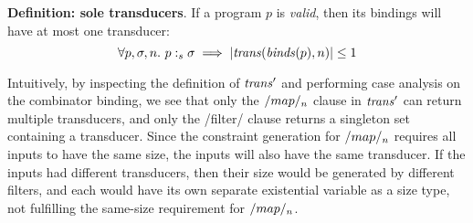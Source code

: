 \textbf{Definition: sole transducers}.
If a program $p$ is \emph{valid}, then its bindings will have at most one transducer:
\[
\forall p, \sigma, n.\ p :_s \sigma \implies |\mathit{trans}(\mathit{binds}(p), n)| \le 1
\]

Intuitively, by inspecting the definition of $\mathit{trans}'$ and performing case analysis on the combinator binding, we see that only the $\Hs/map/_n$ clause in $\mathit{trans}'$ can return multiple transducers, and only the \Hs/filter/ clause returns a singleton set containing a transducer.
Since the constraint generation for $\Hs/map/_n$ requires all inputs to have the same size, the inputs will also have the same transducer.
If the inputs had different transducers, then their size would be generated by different filters, and each would have its own separate existential variable as a size type, not fulfilling the same-size requirement for $\Hs/map/_n$.


 
% 


